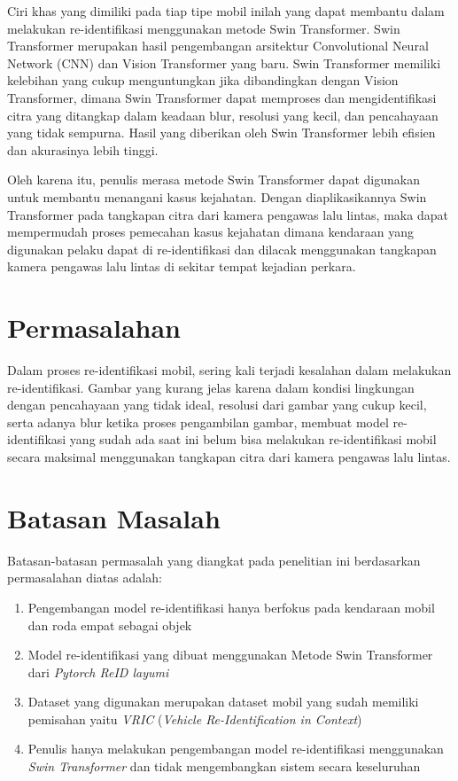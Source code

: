 Ciri khas yang dimiliki pada tiap tipe mobil inilah yang dapat membantu dalam melakukan 
re-identifikasi menggunakan metode Swin Transformer. Swin Transformer merupakan hasil 
pengembangan arsitektur Convolutional Neural Network (CNN) dan Vision Transformer yang 
baru. Swin Transformer memiliki kelebihan yang cukup menguntungkan jika dibandingkan 
dengan Vision Transformer, dimana Swin Transformer dapat memproses dan mengidentifikasi 
citra yang ditangkap dalam keadaan blur, resolusi yang kecil, dan pencahayaan yang tidak 
sempurna. Hasil yang diberikan oleh Swin Transformer lebih efisien dan akurasinya lebih tinggi.

Oleh karena itu, penulis merasa metode Swin Transformer dapat digunakan untuk membantu menangani 
kasus kejahatan. Dengan diaplikasikannya Swin Transformer pada tangkapan citra dari kamera pengawas 
lalu lintas, maka dapat mempermudah proses pemecahan kasus kejahatan dimana kendaraan yang digunakan 
pelaku dapat di re-identifikasi dan dilacak menggunakan tangkapan kamera pengawas lalu lintas di 
sekitar tempat kejadian perkara.

\section{Permasalahan}
\label{sec:permasalahan}

Dalam proses re-identifikasi mobil, sering kali terjadi kesalahan dalam melakukan re-identifikasi.
Gambar yang kurang jelas karena dalam kondisi lingkungan dengan pencahayaan yang tidak ideal,
resolusi dari gambar yang cukup kecil, serta adanya blur ketika proses pengambilan gambar, membuat model re-identifikasi
yang sudah ada saat ini belum bisa melakukan re-identifikasi mobil secara maksimal menggunakan 
tangkapan citra dari kamera pengawas lalu lintas.

\section{Batasan Masalah}
\label{sec:batasanmasalah}

Batasan-batasan permasalah yang diangkat pada penelitian ini berdasarkan permasalahan diatas adalah:

\begin{enumerate}[nolistsep]

      \item Pengembangan model re-identifikasi hanya berfokus pada kendaraan mobil dan roda empat sebagai objek

      \item Model re-identifikasi yang dibuat menggunakan Metode Swin Transformer dari \emph{Pytorch 
      ReID layumi} 

      \item Dataset yang digunakan merupakan dataset mobil yang sudah memiliki pemisahan yaitu \emph{VRIC}
      (\emph{Vehicle Re-Identification in Context})

      \item Penulis hanya melakukan pengembangan model re-identifikasi menggunakan \emph{Swin Transformer} dan tidak 
      mengembangkan sistem secara keseluruhan

\end{enumerate}

